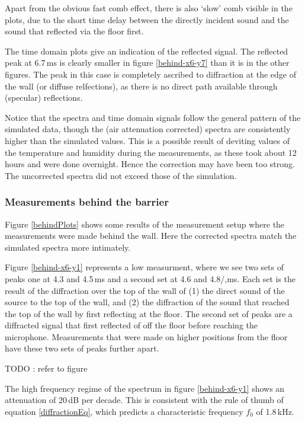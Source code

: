 Apart from the obvious fast comb effect, there is also `slow' comb visible in the plots, due to the short time delay between the directly incident sound and the sound that reflected via the floor first.

The time domain plots give an indication of the reflected signal. The reflected peak at 6.7\,ms is clearly smaller in figure \ref{behind-x6-y7} than it is in the other figures. The peak in this case is completely ascribed to diffraction at the edge of the wall (or diffuse relfections), as there is no direct path available through (specular) reflections.

Notice that the spectra and time domain signals follow the general pattern of the simulated data, though the (air attenuation corrected) spectra are consistently higher than the simulated values. This is a possible result of deviting values of the temperature and humidity during the measurements, as these took about 12 hours and were done overnight. Hence the correction may have been too strong. The uncorrected spectra did not exceed those of the simulation.



\subsubsection*{Measurements behind the barrier}

Figure \ref{behindPlots} shows some results of the measurement setup where the measurements were made behind the wall. Here the corrected spectra match the simulated spectra more intimately.

Figure \ref{behind-x6-y1} represents a low measurment, where we see two sets of peaks one at 4.3 and 4.5\,ms and a second set at 4.6 and 4.8/,ms. Each set is the result of the diffraction over the top of the wall of (1) the direct sound of the source to the top of the wall, and (2) the diffraction of the sound that reached the top of the wall by first reflecting at the floor. The second set of peaks are a diffracted signal that first reflected of off the floor before reaching the microphone. Measurements that were made on higher positions from the floor have these two sets of peaks further apart.

TODO : refer to figure

The high frequency regime of the spectrum in figure \ref{behind-x6-y1} shows an attenuation of 20\,dB per decade. This is consistent with the rule of thumb of equation \ref{diffractionEq}, which predicts a characteristic frequency $f_0$ of 1.8\,kHz.

